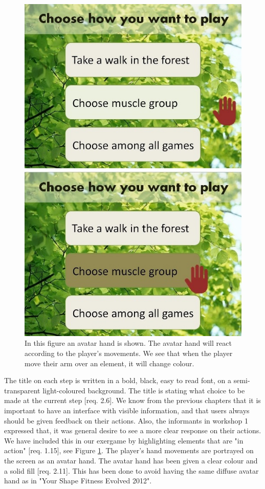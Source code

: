 \begin{figure} [H]
\centering
\includegraphics[scale=0.5]{menuAction.jpg}
\caption[Menu - Action and response]{In this figure an avatar hand is shown. The avatar hand will react according to the player's movements. We see that when the player move their arm over an element, it will change colour.}
\label{fig:avatarAction}
\end{figure} 

The title on each step is written in a bold, black, easy to read font, on a semi-transparent light-coloured background. The title is stating what choice to be made at the current step [req. 2.6]. We know from the previous chapters that it is important to have an interface with visible information, and that users always should be given feedback on their actions. Also, the informants in workshop 1 expressed that, it was general desire to see a more clear response on their actions. We have included this in our exergame by highlighting elements that are "in action" [req. 1.15], see Figure \ref{fig:avatarAction}. The player's hand movements are portrayed on the screen as an avatar hand. The avatar hand has been given a clear colour and a solid fill [req. 2.11]. This has been done to avoid having the same diffuse avatar hand as in "Your Shape Fitness Evolved 2012".  

